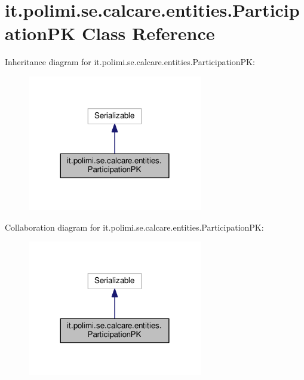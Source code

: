 \hypertarget{classit_1_1polimi_1_1se_1_1calcare_1_1entities_1_1ParticipationPK}{}\section{it.\+polimi.\+se.\+calcare.\+entities.\+Participation\+P\+K Class Reference}
\label{classit_1_1polimi_1_1se_1_1calcare_1_1entities_1_1ParticipationPK}


Inheritance diagram for it.\+polimi.\+se.\+calcare.\+entities.\+Participation\+P\+K\+:
\nopagebreak
\begin{figure}[H]
\begin{center}
\leavevmode
\includegraphics[width=216pt]{classit_1_1polimi_1_1se_1_1calcare_1_1entities_1_1ParticipationPK__inherit__graph}
\end{center}
\end{figure}


Collaboration diagram for it.\+polimi.\+se.\+calcare.\+entities.\+Participation\+P\+K\+:
\nopagebreak
\begin{figure}[H]
\begin{center}
\leavevmode
\includegraphics[width=216pt]{classit_1_1polimi_1_1se_1_1calcare_1_1entities_1_1ParticipationPK__coll__graph}
\end{center}
\end{figure}
